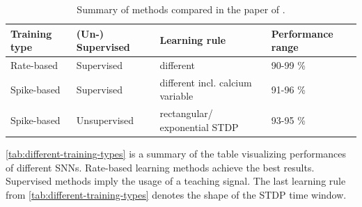 \vspace{-4mm}
\begin{table}[]
    \caption{Summary of methods compared in the paper of \authorsSNN{} \cite{SNN}.}
    \begin{tabular}{|l|l|l|l|}
    \hline
    \textbf{Training type} & \textbf{(Un-) Supervised}    & \textbf{Learning rule}               & \textbf{Performance range} \\ \hline
    Rate-based             & Supervised                   & different                            & 90-99 \%                   \\ \hline
    Spike-based            & Supervised                   & different incl. calcium variable & 91-96 \%                   \\ \hline
    Spike-based            & Unsupervised                 & rectangular/ exponential \ac{STDP}        & 93-95 \%                   \\ \hline
    \end{tabular}
    \label{tab:different-training-types}
\end{table}


\autoref{tab:different-training-types} is a summary of the table visualizing performances of different \acp{SNN}.
Rate-based learning methods achieve the best results.
Supervised methods imply the usage of a teaching signal.
The last learning rule from \autoref{tab:different-training-types} denotes the shape of the \ac{STDP} time window.